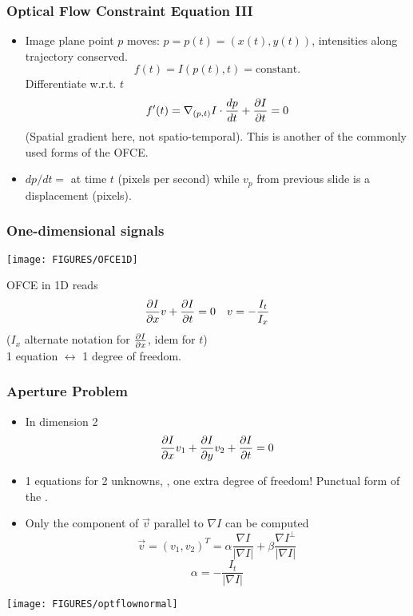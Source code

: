 \documentclass[10pt]{beamer}
\newcommand{\myemph}[1]{{\color{blue}{#1}}}
\begin{document}
\begin{frame}
  \frametitle{Optical Flow Constraint Equation III}
  \begin{itemize}
  \item Image plane point $p$ moves: $p = p(t) = (x(t), y(t))$,  intensities along trajectory conserved.
    $$
    f(t) = I(p(t), t) = \text{constant}.
    $$
    Differentiate w.r.t. $t$
    $$
    f'(t) = \nabla_{(p,t)}I\cdot \frac{d{p}}{d{t}} + \frac{\partial{I}}{\partial{t}} = 0
    $$
    (Spatial gradient here, not spatio-temporal).  This is another of
    the commonly used forms of the OFCE.
  \item $dp/dt = $ \myemph{instantaneous velocity} at
    time $t$ (pixels per second) while $v_p$ from previous slide is a displacement (pixels).
  \end{itemize}
\end{frame}


\begin{frame}
  \frametitle{One-dimensional signals}
  \begin{center}
    \texttt{[image: FIGURES/OFCE1D]}
  \end{center}
  OFCE in 1D reads 
  $$
  \frac{\partial{I}}{\partial{x}}v + \frac{\partial{I}}{\partial{t}} = 0 \quad v = -\frac{I_t}{I_x}
  $$
   ($I_x$ alternate notation for $\frac{\partial{I}}{\partial{x}}$, idem for $t$)\\
   1 equation $\leftrightarrow$ 1 degree of freedom.
\end{frame}



\begin{frame}
  \frametitle{Aperture Problem}
  \begin{itemize}
  \item In dimension 2
    $$
    \frac{\partial{I}}{\partial{x}}v_1 +  \frac{\partial{I}}{\partial{y}}v_2 + \frac{\partial{I}}{\partial{t}} = 0
    $$
  \item 1 equations for 2 unknowns, , one extra degree of freedom! Punctual form of the \myemph{aperture problem}.
  \item Only the component of $\vec{v}$ parallel to $\nabla I$ can be computed
    $$
    \vec{v} = (v_1,v_2)^T = \alpha \frac{\nabla I}{|\nabla I|} + \beta\frac{\nabla I^\bot}{|\nabla I|}
    $$
    $$
    \alpha = -\frac{I_t}{|\nabla I|}
    $$
  \end{itemize}
\end{frame}


\begin{frame}
  \begin{center}
    \texttt{[image: FIGURES/optflownormal]}
  \end{center}
\end{frame}
\end{document}
